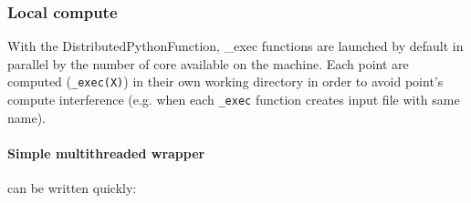 

%
%
%
%

\subsubsection{Local compute}

With the DistributedPythonFunction, \_exec functions are launched by default in parallel by the number of core available on the machine.
Each point are computed (\verb|_exec(X)|) in their own working directory in order to avoid point's compute interference (e.g. when each \verb|_exec| function creates input file with same name).



\paragraph{Simple multithreaded wrapper} can be written quickly:

